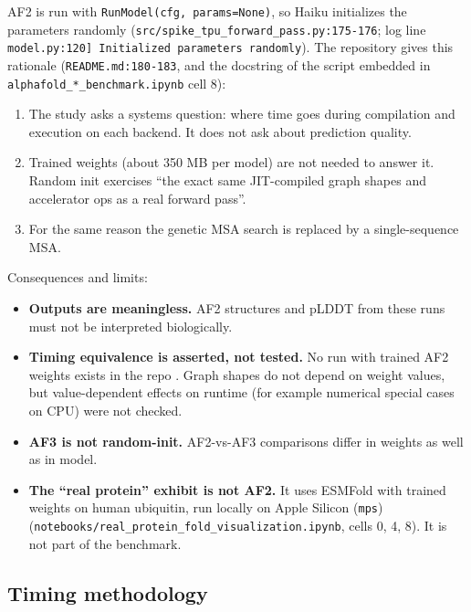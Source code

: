 AF2 is run with \texttt{RunModel(cfg, params=None)}, so Haiku initializes the
parameters randomly (\texttt{src/\allowbreak{}spike\_\allowbreak{}tpu\_\allowbreak{}forward\_\allowbreak{}pass.py:175-176}; log line
\texttt{model.py:120] Initialized parameters randomly}). The repository gives this
rationale (\texttt{README.md:180-183}, and the docstring of the script embedded in
\texttt{alphafold\_\allowbreak{}*\_\allowbreak{}benchmark.ipynb} cell 8):

\begin{enumerate}
  \item The study asks a systems question: where time goes during compilation and
    execution on each backend. It does not ask about prediction quality.
  \item Trained weights (about 350 MB per model) are not needed to answer it.
    Random init exercises ``the exact same JIT-compiled graph shapes and
    accelerator ops as a real forward pass''.
  \item For the same reason the genetic MSA search is replaced by a single-sequence MSA.
\end{enumerate}

Consequences and limits:
\begin{itemize}
  \item \textbf{Outputs are meaningless.} AF2 structures and pLDDT from these runs must not
    be interpreted biologically.
  \item \textbf{Timing equivalence is asserted, not tested.} No run with trained AF2
    weights exists in the repo . Graph shapes do not depend on
    weight values, but value-dependent effects on runtime (for example numerical
    special cases on CPU) were not checked.
  \item \textbf{AF3 is not random-init.} AF2-vs-AF3 comparisons differ in weights as well as
    in model.
  \item \textbf{The ``real protein'' exhibit is not AF2.} It uses ESMFold with trained weights
    on human ubiquitin, run locally on Apple Silicon (\texttt{mps})
    (\texttt{notebooks/\allowbreak{}real\_\allowbreak{}protein\_\allowbreak{}fold\_\allowbreak{}visualization.ipynb}, cells 0, 4, 8). It is not
    part of the benchmark.
\end{itemize}

\subsection{Timing methodology}
\label{sec:meth-timing}

